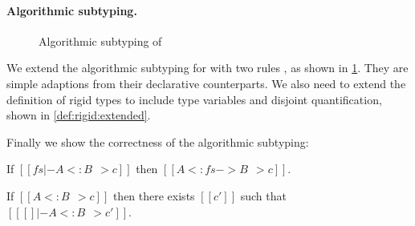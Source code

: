 \paragraph{Algorithmic subtyping.}



\begin{figure}[t]
  \centering
  \caption{Algorithmic subtyping of \fnamee}
  \label{fig:algo:sub:fi}
\end{figure}

We extend the algorithmic subtyping for \namee with two rules
, as shown in \cref{fig:algo:sub:fi}. They are simple
adaptions from their declarative counterparts. We also need to extend the
definition of rigid types to include type variables and disjoint quantification,
shown in \cref{def:rigid:extended}.

\begin{definition} \label{def:rigid:extended}
\end{definition}

Finally we show the correctness of the algorithmic subtyping:

\begin{theorem}[Soundness]
  If $[[ fs |- A <: B ~~> c]]$ then $ [[   A <: fs -> B ~~> c  ]]   $.
\end{theorem}

\begin{theorem}[Completeness]
  If $[[A <: B ~~> c]]$ then there exists $[[c']]$ such that $[[ [] |- A <: B ~~> c']]$.
\end{theorem}



